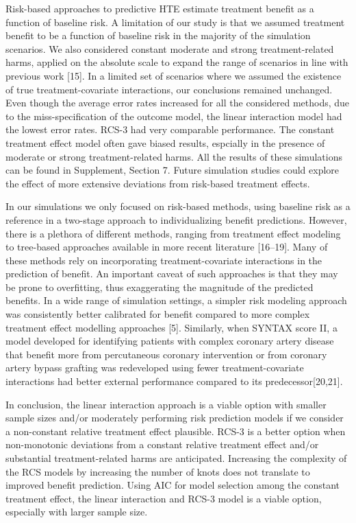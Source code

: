 \documentclass[]{elsarticle} %
\begin{document}
Risk-based approaches to predictive HTE estimate treatment benefit as a
function of baseline risk. A limitation of our study is that we assumed
treatment benefit to be a function of baseline risk in the majority of
the simulation scenarios. We also considered constant moderate and
strong treatment-related harms, applied on the absolute scale to expand
the range of scenarios in line with previous work {[}15{]}. In a limited
set of scenarios where we assumed the existence of true
treatment-covariate interactions, our conclusions remained unchanged.
Even though the average error rates increased for all the considered
methods, due to the miss-specification of the outcome model, the linear
interaction model had the lowest error rates. RCS-3 had very comparable
performance. The constant treatment effect model often gave biased
results, espcially in the presence of moderate or strong
treatment-related harms. All the results of these simulations can be
found in Supplement, Section 7. Future simulation studies could explore
the effect of more extensive deviations from risk-based treatment
effects.

In our simulations we only focused on risk-based methods, using baseline
risk as a reference in a two-stage approach to individualizing benefit
predictions. However, there is a plethora of different methods, ranging
from treatment effect modeling to tree-based approaches available in
more recent literature {[}16--19{]}. Many of these methods rely on
incorporating treatment-covariate interactions in the prediction of
benefit. An important caveat of such approaches is that they may be
prone to overfitting, thus exaggerating the magnitude of the predicted
benefits. In a wide range of simulation settings, a simpler risk
modeling approach was consistently better calibrated for benefit
compared to more complex treatment effect modelling approaches {[}5{]}.
Similarly, when SYNTAX score II, a model developed for identifying
patients with complex coronary artery disease that benefit more from
percutaneous coronary intervention or from coronary artery bypass
grafting was redeveloped using fewer treatment-covariate interactions
had better external performance compared to its predecessor{[}20,21{]}.

In conclusion, the linear interaction approach is a viable option with
smaller sample sizes and/or moderately performing risk prediction models
if we consider a non-constant relative treatment effect plausible. RCS-3
is a better option when non-monotonic deviations from a constant
relative treatment effect and/or substantial treatment-related harms are
anticipated. Increasing the complexity of the RCS models by increasing
the number of knots does not translate to improved benefit prediction.
Using AIC for model selection among the constant treatment effect, the
linear interaction and RCS-3 model is a viable option, especially with
larger sample size.
\end{document}

